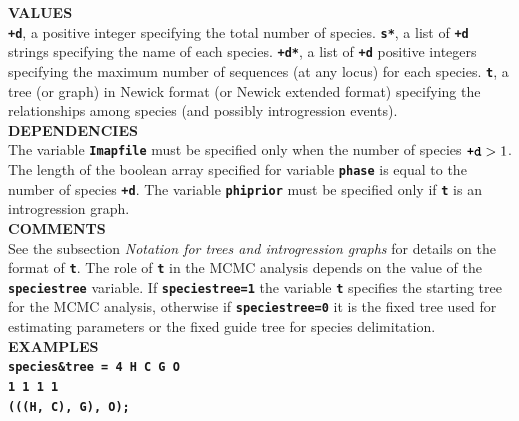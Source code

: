 \documentclass{book}
\numberwithin{equation}{section} \renewcommand{\baselinestretch}{0.55}
\begin{document}
\textbf{VALUES} \vspace{5pt}\\
\textbf{\texttt{+d}}, a positive integer specifying the total number of species. \textbf{\texttt{s*}}, a list of \textbf{\texttt{+d}} strings specifying the name of each species. \textbf{\texttt{+d*}}, a list of \textbf{\texttt{+d}} positive integers specifying the maximum number of sequences (at any locus) for each species. \textbf{\texttt{t}}, a tree (or graph) in Newick format (or Newick extended format) specifying the relationships among species (and possibly introgression events). \vspace{5pt}\\
\textbf{DEPENDENCIES} \vspace{5pt}\\
The variable \textbf{\texttt{Imapfile}} must be specified only when
the number of species $\textbf{\texttt{+d}} > 1$. The length of the
boolean array specified for variable \textbf{\texttt{phase}} is equal
to the number of species \textbf{\texttt{+d}}. The variable
\textbf{\texttt{phiprior}} must be specified only if
\textbf{\texttt{t}} is an introgression graph.
\vspace{5pt}\\
\textbf{COMMENTS} \vspace{5pt}\\
See the subsection \emph{Notation for trees and introgression graphs}
for details on the format of \textbf{\texttt{t}}. The role of
\textbf{\texttt{t}} in the MCMC analysis depends on the value of the
\textbf{\texttt{speciestree}} variable. If
\textbf{\texttt{speciestree=1}} the variable \textbf{\texttt{t}}
specifies the starting tree for the MCMC analysis, otherwise if
\textbf{\texttt{speciestree=0}} it is the fixed tree used for
estimating parameters or the fixed guide tree for species
delimitation.
\vspace{5pt}\\
\textbf{EXAMPLES} \vspace{5pt}\\
\textbf{\texttt{species\&tree = 4  H  C  G  O}} \vspace{2pt}\\
\hspace*{7.2pc}  \textbf{\texttt{1  1  1  1}} \vspace{2pt}\\
\hspace*{7.2pc}  \textbf{\texttt{(((H, C), G), O);}} \vspace{10pt}\\
\end{document}
